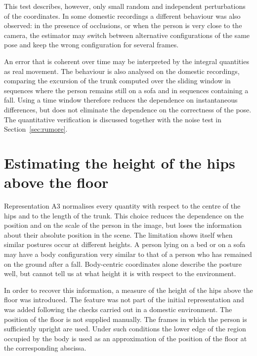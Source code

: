 This test describes, however, only small random and independent perturbations of the coordinates. In some domestic recordings a different behaviour was also observed: in the presence of occlusions, or when the person is very close to the camera, the estimator may switch between alternative configurations of the same pose and keep the wrong configuration for several frames.

An error that is coherent over time may be interpreted by the integral quantities as real movement. The behaviour is also analysed on the domestic recordings, comparing the excursion of the trunk computed over the sliding window in sequences where the person remains still on a sofa and in sequences containing a fall. Using a time window therefore reduces the dependence on instantaneous differences, but does not eliminate the dependence on the correctness of the pose. The quantitative verification is discussed together with the noise test in Section~\ref{sec:rumore}.

\section{Estimating the height of the hips above the floor}
\label{sec:pavimento}

Representation A3 normalises every quantity with respect to the centre of the hips and to the length of the trunk. This choice reduces the dependence on the position and on the scale of the person in the image, but loses the information about their absolute position in the scene.
The limitation shows itself when similar postures occur at different heights. A person lying on a bed or on a sofa may have a body configuration very similar to that of a person who has remained on the ground after a fall. Body-centric coordinates alone describe the posture well, but cannot tell us at what height it is with respect to the environment.

In order to recover this information, a measure of the height of the hips above the floor was introduced. The feature was not part of the initial representation and was added following the checks carried out in a domestic environment. The position of the floor is not supplied manually. The frames in which the person is sufficiently upright are used. Under such conditions the lower edge of the region occupied by the body is used as an approximation of the position of the floor at the corresponding abscissa.

